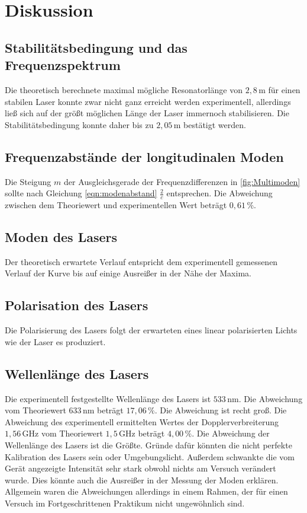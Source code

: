 \section{Diskussion}
\label{sec:Diskussion}

\subsection{Stabilitätsbedingung und das Frequenzspektrum}
Die theoretisch berechnete maximal mögliche Resonatorlänge von $2{,}8 \, \unit{\meter}$ für einen stabilen Laser konnte zwar nicht ganz erreicht werden experimentell, allerdings ließ sich auf der größt möglichen Länge der Laser immernoch stabilisieren. Die Stabilitätsbedingung konnte daher bis zu $2{,}05 \, \unit{\meter}$ bestätigt werden. 

\subsection{Frequenzabstände der longitudinalen Moden}
Die Steigung $m$ der Ausgleichsgerade der Frequenzdifferenzen in \autoref{fig:Multimoden} sollte nach Gleichung \ref{eqn:modenabstand} $\frac{2}{c}$ entsprechen. Die Abweichung zwischen dem Theoriewert und experimentellen Wert beträgt $0{,}61 \, \%$. 

\subsection{Moden des Lasers}
Der theoretisch erwartete Verlauf entspricht dem experimentell gemessenen Verlauf der Kurve bis auf einige Ausreißer in der Nähe der Maxima. 

\subsection{Polarisation des Lasers}
Die Polarisierung des Lasers folgt der erwarteten eines linear polarisierten Lichts wie der Laser es produziert. 

\subsection{Wellenlänge des Lasers} 
Die experimentell festgestellte Wellenlänge des Lasers ist $533 \, \unit{\nano\meter}$. Die Abweichung vom Theoriewert $633 \, \unit{\nano\meter}$ beträgt $17{,}06 \, \%$. Die Abweichung ist recht groß. 
Die Abweichung des experimentell ermittelten Wertes der Dopplerverbreiterung $1{,}56 \, \unit{\giga\hertz}$ vom Theoriewert  $1{,}5 \, \unit{\giga\hertz}$ beträgt $4{,}00 \, \%$. Die Abweichung der Wellenlänge des Lasers ist die Größte. Gründe dafür könnten die nicht perfekte Kalibration des Lasers sein oder Umgebungslicht. Außerdem schwankte die vom Gerät angezeigte Intensität sehr stark obwohl nichts am Versuch verändert wurde. Dies könnte auch die Ausreißer in der Messung der Moden erklären. Allgemein waren die Abweichungen allerdings in einem Rahmen, der für einen Versuch im Fortgeschrittenen Praktikum nicht ungewöhnlich sind. 